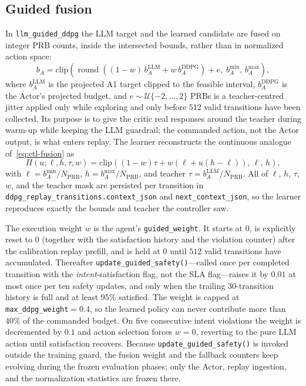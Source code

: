 \subsection{Guided fusion}
\label{subsec:ctl-fusion}
In \texttt{llm\_guided\_ddpg} the LLM target and the learned candidate are fused on integer PRB counts, inside the intersected bounds, rather than in normalized action space:
\begin{equation}
b_A=\mathrm{clip}\!\left(\operatorname{round}\!\left((1-w)\,b_A^{\mathrm{LLM}}+w\,b_A^{\mathrm{DDPG}}\right)+e,\;b_A^{\min},\,b_A^{\max}\right),
\label{eq:ctl-fusion}
\end{equation}
where $b_A^{\mathrm{LLM}}$ is the projected A1 target clipped to the feasible interval, $b_A^{\mathrm{DDPG}}$ is the Actor's projected budget, and $e\sim\mathcal{U}\{-2,\dots,2\}$ PRBs is a teacher-centred jitter applied only while exploring and only before $512$ valid transitions have been collected. Its purpose is to give the critic real responses around the teacher during warm-up while keeping the LLM guardrail; the commanded action, not the Actor output, is what enters replay. The learner reconstructs the continuous analogue of~\eqref{eq:ctl-fusion} as
\begin{equation}
\Pi(u;\ell,h,\tau,w)=\mathrm{clip}\!\left((1-w)\tau+w\left(\ell+u(h-\ell)\right),\,\ell,\,h\right),
\label{eq:ctl-proj}
\end{equation}
with $\ell=b_A^{\min}/N_{\mathrm{PRB}}$, $h=b_A^{\max}/N_{\mathrm{PRB}}$, and teacher $\tau=b_A^{\mathrm{LLM}}/N_{\mathrm{PRB}}$. All of $\ell$, $h$, $\tau$, $w$, and the teacher mask are persisted per transition in \texttt{ddpg\_replay\_transitions.context\_json} and \texttt{next\_context\_json}, so the learner reproduces exactly the bounds and teacher the controller saw.

The execution weight $w$ is the agent's \texttt{guided\_weight}. It starts at $0$, is explicitly reset to $0$ (together with the satisfaction history and the violation counter) after the calibration replay prefill, and is held at $0$ until $512$ valid transitions have accumulated. Thereafter \texttt{update\_guided\_safety()}---called once per completed transition with the \emph{intent}-satisfaction flag, not the SLA flag---raises it by $0.01$ at most once per ten safety updates, and only when the trailing $30$-transition history is full and at least $95\%$ satisfied. The weight is capped at \texttt{max\_ddpg\_weight}${}=0.4$, so the learned policy can never contribute more than $40\%$ of the commanded budget. On five consecutive intent violations the weight is decremented by $0.1$ and action selection forces $w=0$, reverting to the pure LLM action until satisfaction recovers. Because \texttt{update\_guided\_safety()} is invoked outside the training guard, the fusion weight and the fallback counters keep evolving during the frozen evaluation phases; only the Actor, replay ingestion, and the normalization statistics are frozen there.

